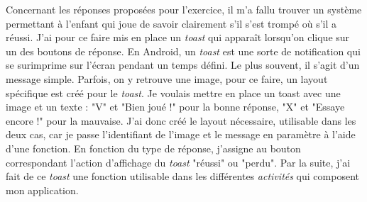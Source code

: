  

Concernant les réponses proposées pour l'exercice, il m'a fallu trouver un système permettant à l'enfant qui joue de savoir clairement s'il s'est trompé où s'il a réussi. J'ai pour ce faire mis en place un \textit{toast} qui apparaît lorsqu'on clique sur un des boutons de réponse. En Android, un \textit{toast} est une sorte de notification qui se surimprime sur l'écran pendant un temps défini. Le plus souvent, il s'agit d'un message simple. Parfois, on y retrouve une image, pour ce faire, un layout spécifique est créé pour le \textit{toast}. Je voulais mettre en place un toast avec une image et un texte : "V" et "Bien joué !" pour la bonne réponse, "X" et "Essaye encore !" pour la mauvaise. J'ai donc créé le layout nécessaire, utilisable dans les deux cas, car je passe l'identifiant de l'image et le message en paramètre à l'aide d'une fonction. En fonction du type de réponse, j'assigne au bouton correspondant l'action d'affichage du \textit{toast} "réussi" ou "perdu". Par la suite, j'ai fait de ce \textit{toast} une fonction utilisable dans les différentes \textit{activités} qui composent mon application.\\

